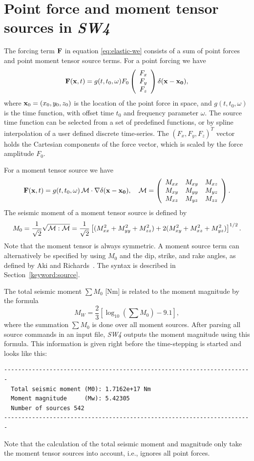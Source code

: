 \documentclass[11pt]{report}
\begin{document}
\section{Point force and moment tensor sources in \emph{SW4}}\label{sec:time-functions}
The forcing term ${\bf F}$ in equation \eqref{eq:elastic-we} consists of a sum of point forces and
point moment tensor source terms. For a point forcing we have
\[
{\bf F}({\bf x},t) = g(t,t_0,\omega) F_0 \left(\begin{array}{c}
  F_x\\ F_y\\ F_z\end{array}\right) \delta ({\bf x} - {\bf x_0}),
\]
where ${\bf x}_0=(x_0,y_0,z_0)$ is the location of the point force in space, and $g(t,t_0,\omega)$
is the time function, with offset time $t_0$ and frequency parameter $\omega$. The source time
function can be selected from a set of predefined functions, or by spline interpolation of a user
defined discrete time-series. The $(F_x,F_y,F_z)^T$ vector holds the Cartesian components of the force
vector, which is scaled by the force amplitude $F_0$. 

For a moment tensor source we have
\[
{\bf F}({\bf x},t) = g(t,t_0,\omega)\, {\cal  M} \cdot \nabla \delta ({\bf x} - {\bf
  x_0}), \quad 
{\cal M} = \left(\begin{array}{ccc}
M_{xx} & M_{xy} & M_{xz}\\
M_{xy} & M_{yy} & M_{yz}\\
M_{xz} & M_{yz} & M_{zz}
\end{array}
\right).
\]
The seismic moment of a moment tensor source is defined by 
\[
M_0 = \frac{1}{\sqrt{2}}\sqrt{{\cal M}:{\cal M}} = \frac{1}{\sqrt{2}}\left[ (M_{xx}^2 + M_{yy}^2 + M_{zz}^2 ) + 2
  (M_{xy}^2 + M_{xz}^2 + M_{yz}^2) \right]^{1/2}.
\]
Note that the moment tensor is always symmetric. A moment source term can alternatively be specified
by using $M_0$ and the dip, strike, and rake angles, as defined by Aki and
Richards~\cite{Aki-Richards-02}. The syntax is described in Section~\ref{keyword:source}.

The total seismic moment $\sum M_0$ [Nm] is related to the moment magnitude by the formula
\[
M_W = \frac{2}{3}\left[\log_{10}\left(\sum M_0\right) - 9.1\right],
\]
where the summation $\sum M_0$ is done over all moment sources.
After parsing all source commands in an input file, \emph{SW4} outputs the moment magnitude using
this formula. This information is given right before the time-stepping is started and looks like this:
\begin{verbatim}
-----------------------------------------------------------------------
  Total seismic moment (M0): 1.7162e+17 Nm 
  Moment magnitude     (Mw): 5.42305
  Number of sources 542
-----------------------------------------------------------------------
\end{verbatim}
Note that the calculation of the total seismic moment and magnitude only take the moment tensor sources into
account, i.e., ignores all point forces.
\end{document}
